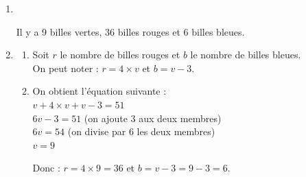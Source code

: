 \begin{enumerate}
	\item $\phantom{X}$
	
	
	\medskip
	Il y a 9 billes vertes, 36 billes rouges et 6 billes bleues.
	
	\item 
	\begin{enumerate}
		\item Soit $r$ le nombre de billes rouges et $b$ le nombre de billes bleues.\\
		On peut noter : $r=4\times v$ et $b=v-3$.
		
		\item On obtient l'équation suivante : \\
		$v+4\times v+v-3=51$\\
		$6v-3=51$ (on ajoute 3 aux deux membres)\\
		$6v=54$ (on divise par 6 les deux membres)\\
		$v=9$
		
		\medskip
		Donc : $r=4\times9=36$ et $b=v-3=9-3=6$. 
	\end{enumerate}
\end{enumerate}